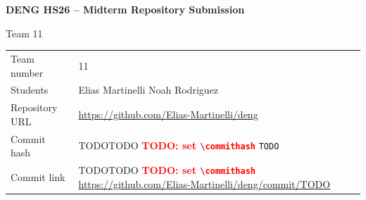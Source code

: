 \documentclass[11pt,a4paper]{article}
\newcommand{\teamnumber}{11}
\newcommand{\repourl}{https://github.com/Elias-Martinelli/deng}
\newcommand{\commithash}{TODO}
\newcommand{\commiturl}{\repourl/commit/\commithash}
\newcommand{\todomarker}{TODO}
\newcommand{\checkedvalue}[1]{%
  \ifx\commithash\todomarker
    \textcolor{red}{\textbf{TODO: set \texttt{\textbackslash commithash}}}%
  \else#1\fi}
\begin{document}
{\Large\bfseries DENG HS26 -- Midterm Repository Submission\par}
\vspace{0.5em}
{\large Team \teamnumber\par}
\vspace{2em}

\renewcommand{\arraystretch}{1.6}
\begin{tabular}{@{}p{}p{}@{}}
  \toprule
  Team number    & \teamnumber \\
  Students       & Elias Martinelli \newline Noah Rodriguez \\
  Repository URL & \url{\repourl} \\
  Commit hash    & \checkedvalue{\texttt{\commithash}} \\
  Commit link    & \checkedvalue{\url{\commiturl}} \\
  \bottomrule
\end{tabular}
\end{document}
